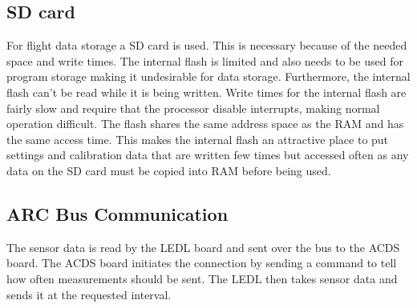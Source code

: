 \subsection{SD card}

For flight data storage a SD card is used. This is necessary because of the needed space and write times. The internal flash is limited and also needs to be used for program storage making it undesirable for data storage. Furthermore, the internal flash can't be read while it is being written. Write times for the internal flash are fairly slow and require that the processor disable interrupts, making normal operation difficult. The flash shares the same address space as the \ac{RAM} and has the same access time. This makes the internal flash an attractive place to put settings and calibration data that are written few times but accessed often as any data on the SD card must be copied into \ac{RAM} before being used.

\subsection{\acs{ARC} Bus Communication}

The sensor data is read by the \ac{LEDL} board and sent over the bus to the \ac{ACDS} board. The \ac{ACDS} board initiates the connection by sending a command to tell how often measurements should be sent. The \ac{LEDL} then takes sensor data and sends it at the requested interval.

